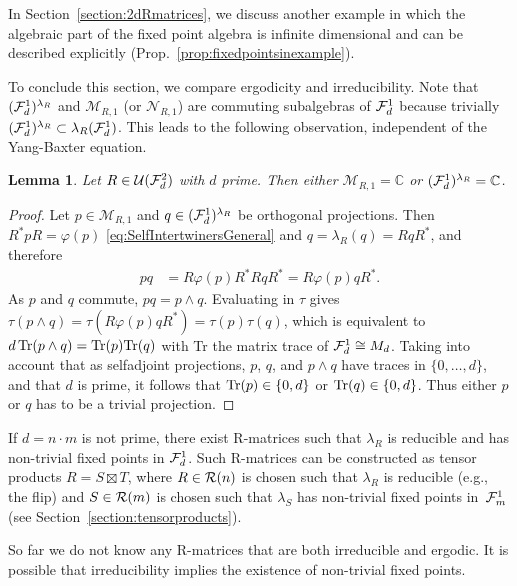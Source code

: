 \documentclass[12pt,a4paper]{amsart}
\numberwithin{equation}{section}
\newtheorem{lemma}[theorem]{Lemma}
\theoremstyle{remark}
\def\C{\mathbb{C}}
\newcommand{\la}{\lambda}
\newcommand{\CM}[0]{\mathcal{M}} \newcommand{\CN}[0]{\mathcal{N}}
\newcommand{\CU}[0]{\mathcal{U}} \newcommand{\CV}[0]{\mathcal{V}}
\begin{document}
In Section~\ref{section:2dRmatrices}, we discuss another example in which the algebraic part of the fixed point algebra is infinite dimensional and can be described explicitly (Prop.~\ref{prop:fixedpointsinexample}).


\bigskip 


To conclude this section, we compare ergodicity and irreducibility. Note that $(\CF_d^1)^{\la_R}$ and $\CM_{R,1}$ (or $\CN_{R,1}$) are commuting subalgebras of $\mathcal{F}_d^1$ because trivially $(\CF_d^1)^{\la_R}\subset\la_R(\CF_d^1)$. This leads to the following observation, independent of the Yang-Baxter equation.

\begin{lemma}\label{lemma:dprime}
    Let $R\in\CU(\CF_d^2)$ with $d$ prime. Then either $\CM_{R,1}=\C$ or $(\CF_d^1)^{\lambda_R}=\C$.
\end{lemma}
\begin{proof}
    Let $p\in\CM_{R,1}$ and $q\in(\mathcal{F}_d^1)^{\lambda_R}$ be orthogonal projections. Then $R^*pR=\varphi(p)$ \eqref{eq:SelfIntertwinersGeneral} and $q=\la_R(q)=RqR^*$, and therefore
    \begin{align*}
     pq
     &=
     R\varphi(p)R^*RqR^*
     =
     R\varphi(p)qR^*
     .
    \end{align*}
    As $p$ and $q$ commute, $pq=p\wedge q$. Evaluating in $\tau$ gives $\tau(p\wedge q)=\tau(R\varphi(p)qR^*)=\tau(p)\tau(q)$, which is equivalent to $d\,{\rm Tr}(p\wedge q)={\rm Tr}(p){\rm Tr}(q)$ with Tr the matrix trace of $\mathcal{F}_d^1\cong M_d$. Taking into account that as selfadjoint projections, $p$, $q$, and $p\wedge q$ have traces in $\{0,\ldots,d\}$, and that $d$ is prime, it follows that ${\rm Tr}(p)\in\{0,d\}$ or ${\rm Tr}(q)\in\{0,d\}$. Thus either $p$ or $q$ has to be a trivial projection.
\end{proof}

If $d=n\cdot m$ is not prime, there exist R-matrices such that $\lambda_R$ is reducible and has non-trivial fixed points in $\mathcal{F}_d^1$. Such R-matrices can be constructed as tensor products $R=S\boxtimes T$, where $R\in\mathcal{R}(n)$ is chosen such that $\la_R$ is reducible (e.g., the flip) and $S\in\mathcal{R}(m)$ is chosen such that $\la_S$ has non-trivial fixed points in~$\mathcal{F}_m^1$ (see Section~\ref{section:tensorproducts}).

\bigskip

So far we do not know any R-matrices that are both irreducible and ergodic. It is possible that irreducibility implies the existence of non-trivial fixed points.
\end{document}
